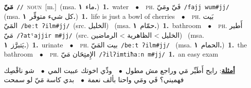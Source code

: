 \documentclass[10pt,a4paper,twoside]{article} %
\begin{document}
\begin{multicols}{2}
{\setlength\topsep{0pt}\textbf{\foreignlanguage{arabic}{مَيّ}}\ {\color{gray}\texttt{//}\color{black}}\ \textsc{noun}\ [m.]\ \color{gray}(msa. \foreignlanguage{arabic}{ماء}~\foreignlanguage{arabic}{\textbf{١.}})\color{black}\ \textbf{1.}~water\ \ $\bullet$\ \ \textsc{ph.} \color{gray} \foreignlanguage{arabic}{فَيّ ومَيّ}\color{black}\ {\color{gray}\texttt{/{\sffamily fajj wum\#jj}/}\color{black}}\ \color{gray} (msa. \foreignlanguage{arabic}{كل شيء متوفِّر}~\foreignlanguage{arabic}{\textbf{١.}})\color{black}\ \textbf{1.}~life is just a bowl of cherries\ \ $\bullet$\ \ \textsc{ph.} \color{gray} \foreignlanguage{arabic}{بَيت المَيّ}\color{black}\ {\color{gray}\texttt{/{\sffamily beːt ʔilm\#jj}/}\color{black}}\ \color{gray}(src. \foreignlanguage{arabic}{الخليل})\color{black}\ \color{gray} (msa. \foreignlanguage{arabic}{حمّام}~\foreignlanguage{arabic}{\textbf{١.}})\color{black}\ \textbf{1.}~bathroom\ \ $\bullet$\ \ \textsc{ph.} \color{gray} \foreignlanguage{arabic}{أَطير مَيّ}\color{black}\ {\color{gray}\texttt{/{\sffamily ʔatˤajjir m\#jj}/}\color{black}}\ \color{gray}(src. \foreignlanguage{arabic}{الخليل > الظاهرية > الرماضين})\color{black}\ \color{gray} (msa. \foreignlanguage{arabic}{يَتبرَّز}~\foreignlanguage{arabic}{\textbf{١.}})\color{black}\ \textbf{1.}~urinate\ \ $\bullet$\ \ \textsc{ph.} \color{gray} \foreignlanguage{arabic}{بيت المَيّ}\color{black}\ {\color{gray}\texttt{/{\sffamily beːt ʔilm\#jj}/}\color{black}}\ \color{gray} (msa. \foreignlanguage{arabic}{الحمام}~\foreignlanguage{arabic}{\textbf{١.}})\color{black}\ \textbf{1.}~the bathroom\ \ $\bullet$\ \ \textsc{ph.} \color{gray} \foreignlanguage{arabic}{الإِمتِحَان مَيّ}\color{black}\ {\color{gray}\texttt{/{\sffamily ʔilʔimtiħaːn m\#jj}/}\color{black}}\ \textbf{1.}~an easy exam\  \begin{flushright}\color{gray}\foreignlanguage{arabic}{\textbf{\underline{\foreignlanguage{arabic}{أمثلة}}}: رايح أَطَيِّر مَي وراجع مش مطول\ $\bullet$\ \  ودِّي اخوتك عبيت المي\ $\bullet$\ \  شو ناقْصِك فهميني؟ فَي ومَي واحنا بألف نعمة\ $\bullet$\ \  بدي كاسة مَيّ لو سمحت}\end{flushright}\color{black}} \vspace{2mm}


\end{multicols}
\end{document}
